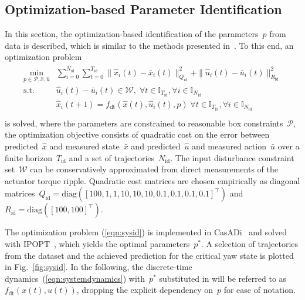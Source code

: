 \subsection{Optimization-based Parameter Identification}
\label{sec:parameteridentification}
In this section, the optimization-based identification of the parameters~$p$ from data is described, which is similar to the methods presented in~\cite{bock1983recent,valluru2017development,simpson2023efficient,bodmer2024optimization}.
To this end, an optimization problem
\begin{align}
\begin{split}\label{eqn:sysid}
\min_{p\in\mathcal{P}, \hat{x},\hat{u}} & \sum_{i=0}^{N_\text{id}} \sum_{t=0}^{T_\text{id}}\|\hat{x}_i(t)-\bar{x}_i(t)\|^2_{Q_\text{id}}+\|\hat{u}_i(t)-\bar{u}_i(t)\|^2_{R_\text{id}}\\
\text{s.t.}\quad 
&\hat{u}_i(t)-\bar{u}_i(t)\in\mathcal{W},\;\forall t\in\mathbb{I}_{T_\text{id}},\forall i\in\mathbb{I}_{N_\text{id}}\\
&\hat{x}_i(t+1) = f_\text{dt}(\hat{x}(t), \hat{u}_i(t),p)
\;\forall t\in\mathbb{I}_{T_\text{id}},\forall i\in\mathbb{I}_{N_\text{id}}\\
\end{split}
\end{align}
is solved, where the parameters are constrained to reasonable box constraints~$\mathcal{P}$, the optimization objective consists of quadratic cost on the error between predicted~$\hat{x}$ and measured state~$\bar{x}$ and predicted~$\hat{u}$ and measured action~$\bar{u}$ over a finite horizon~$T_\text{id}$ and a set of trajectories~$N_\text{id}$.
The input disturbance constraint set~$\mathcal{W}$ can be conservatively approximated from direct measurements of the actuator torque ripple.
Quadratic cost matrices are chosen empirically as diagonal matrices~$Q_\text{id}=\text{diag}([100,1,1,10,10,10,0.1,0.1,0.1,0.1]^\top)$ and~$R_\text{id}=\text{diag}([100,100]^\top)$.

The optimization problem (\ref{eqn:sysid}) is implemented in CasADi~\cite{andersson2019casadi} and solved with IPOPT~\cite{wachter2006implementation}, which yields the optimal parameters~$p^*$.
A selection of trajectories from the dataset and the achieved prediction for the critical yaw state is plotted in Fig.~\ref{fig:sysid}.
In the following, the discrete-time dynamics~(\ref{eqn:systemdynamics}) with~$p^*$ substituted in will be referred to as~$f_\text{dt}(x(t), u(t))$, dropping the explicit dependency on~$p$ for ease of notation.

